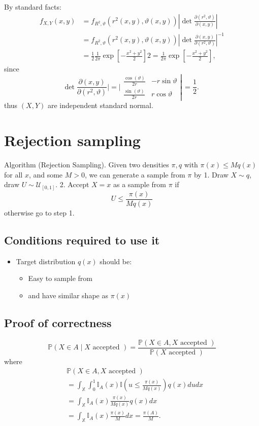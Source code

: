 \documentclass{article}
\begin{document}
By standard facts:
$$
\begin{aligned}
f_{X, Y}(x, y) & =f_{R^2, \vartheta}\left(r^2(x, y), \vartheta(x, y)\right)\left|\operatorname{det} \frac{\partial\left(r^2, \vartheta\right)}{\partial(x, y)}\right| \\
& =f_{R^2, \vartheta}\left(r^2(x, y), \vartheta(x, y)\right)\left|\operatorname{det} \frac{\partial(x, y)}{\partial\left(r^2, \vartheta\right)}\right|^{-1} \\
& =\frac{1}{2} \frac{1}{2 \pi} \exp \left[-\frac{x^2+y^2}{2}\right] 2=\frac{1}{2 \pi} \exp \left[-\frac{x^2+y^2}{2}\right],
\end{aligned}
$$
since
$$
\left.\operatorname{det} \frac{\partial(x, y)}{\partial\left(r^2, \vartheta\right)}|=| \begin{array}{ll}
\frac{\cos (\vartheta)}{2 r} & -r \sin \vartheta \\
\frac{\sin (\vartheta)}{2 r} & r \cos \vartheta
\end{array} \right\rvert\,=\frac{1}{2} \text {. }
$$
thus $(X, Y)$ are independent standard normal.

\section{Rejection sampling}
Algorithm (Rejection Sampling). Given two densities $\pi, q$ with $\pi(x) \leq M q(x)$ for all $x$, and some $M>0$, we can generate a sample from $\pi$ by
1. Draw $X \sim q$, draw $U \sim \mathcal{U}_{[0,1]}$.
2. Accept $X=x$ as a sample from $\pi$ if
$$
U \leq \frac{\pi(x)}{M q(x)}
$$
otherwise go to step 1.

\subsection{Conditions required to use it}
\begin{itemize}
    \item Target distribution $q(x)$ should be:
    \begin{itemize}
        \item Easy to sample from
        \item and have similar shape as $\pi(x)$
    \end{itemize}
\end{itemize}

\subsection{Proof of correctness}
$$
\mathbb{P}(X \in A \mid X \text { accepted })=\frac{\mathbb{P}(X \in A, X \text { accepted })}{\mathbb{P}(X \text { accepted })}
$$
where
$$
\begin{aligned}
& \mathbb{P}(X \in A, X \text { accepted }) \\
& =\int_{\mathbb{X}} \int_0^1 \mathbb{I}_A(x) \mathbb{I}\left(u \leq \frac{\pi(x)}{M q(x)}\right) q(x) d u d x \\
& =\int_{\mathbb{X}} \mathbb{I}_A(x) \frac{\pi(x)}{M q(x)} q(x) d x \\
& =\int_{\mathbb{X}} \mathbb{I}_A(x) \frac{\pi(x)}{M} d x=\frac{\pi(A)}{M} .
\end{aligned}
$$
\end{document}
